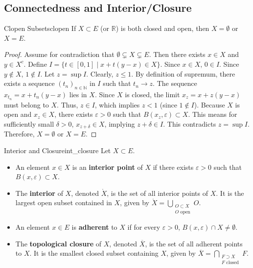 \documentclass[11pt, a4paper]{article}
\newcommand{\R}{\mathbb{R}}
\newcommand{\N}{\mathbb{N}}
\newcommand{\eps}{\varepsilon}
\begin{document}
\subsection{Connectedness and Interior/Closure}
\begin{proposition}{Clopen Subsets}{clopen}
If $X \subset E$ (or $\R$) is both closed and open, then $X = \emptyset$ or $X = E$.
\end{proposition}
\begin{proof}
Assume for contradiction that $\emptyset \subsetneq X \subsetneq E$.
Then there exists $x \in X$ and $y \in X^c$.
Define $I = \{t \in [0, 1] \mid x + t(y - x) \in X\}$. Since $x \in X$, $0 \in I$. Since $y \notin X$, $1 \notin I$.
Let $z = \sup I$. Clearly, $z \le 1$.
By definition of supremum, there exists a sequence $(t_n)_{n \in \N}$ in $I$ such that $t_n \to z$.
The sequence $x_{t_n} = x + t_n(y - x)$ lies in $X$. Since $X$ is closed, the limit $x_z = x + z(y - x)$ must belong to $X$. Thus, $z \in I$, which implies $z < 1$ (since $1 \notin I$).
Because $X$ is open and $x_z \in X$, there exists $\eps > 0$ such that $B(x_z, \eps) \subset X$.
This means for sufficiently small $\delta > 0$, $x_{z+\delta} \in X$, implying $z+\delta \in I$.
This contradicts $z = \sup I$. Therefore, $X = \emptyset$ or $X = E$.
\end{proof}

\begin{definition}{Interior and Closure}{int_closure}
Let $X \subset E$.
\begin{itemize}
    \item An element $x \in X$ is an \textbf{interior point} of $X$ if there exists $\eps > 0$ such that $B(x, \eps) \subset X$.
    \item The \textbf{interior} of $X$, denoted $\mathring{X}$, is the set of all interior points of $X$. It is the largest open subset contained in $X$, given by $\displaystyle \mathring{X} = \bigcup_{\substack{O \subset X \\ O \text{ open}}} O$.
    \item An element $x \in E$ is \textbf{adherent} to $X$ if for every $\eps > 0$, $B(x, \eps) \cap X \neq \emptyset$.
    \item The \textbf{topological closure} of $X$, denoted $\overline{X}$, is the set of all adherent points to $X$. It is the smallest closed subset containing $X$, given by $\displaystyle \overline{X} = \bigcap_{\substack{F \supset X \\ F \text{ closed}}} F$.
\end{itemize}
\end{definition}
\end{document}
